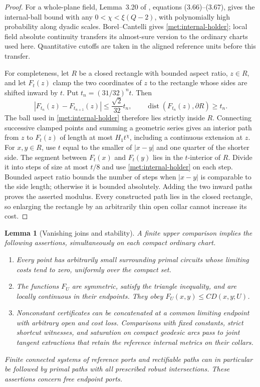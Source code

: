 \documentclass[11pt]{article}
\numberwithin{equation}{section}
\newtheorem{lemma}[theorem]{Lemma}
\theoremstyle{definition}
\theoremstyle{remark}
\newcommand{\1}{\mathbf 1}
\DeclareMathOperator{\dist}{dist}
\begin{document}
\begin{proof}
For a whole-plane field, Lemma~3.20 of \cite{DubedatEtAlWeakMetric}, equations
(3.66)--(3.67), gives the internal-ball bound with any
$0<\chi<\xi(Q-2)$, with polynomially high probability along dyadic
scales.  Borel--Cantelli gives \eqref{met:internal-holder}; local field
absolute continuity transfers its almost-sure version to the ordinary
charts used here.  Quantitative cutoffs are taken in the aligned
reference units before this transfer.

For completeness, let $R$ be a closed rectangle with bounded aspect
ratio, $z\in R$, and let $F_t(z)$ clamp the two coordinates of $z$ to
the rectangle whose sides are shifted inward by $t$.  Put
$t_n=(31/32)^nt$.  Then
\[
 |F_{t_n}(z)-F_{t_{n+1}}(z)|\leq \frac{\sqrt2}{32}t_n,
 \qquad \dist(F_{t_n}(z),\partial R)\geq t_n.
\]
The ball used in \eqref{met:internal-holder} therefore lies strictly
inside $R$.  Connecting successive clamped points and summing a
geometric series gives an interior path from $z$ to $F_t(z)$ of length
at most $H_1t^\chi$, including a continuous extension at $z$.  For
$x,y\in R$, use $t$ equal to the smaller of $|x-y|$ and one quarter of
the shorter side.  The segment between $F_t(x)$ and $F_t(y)$ lies in the
$t$-interior of $R$.  Divide it into steps of size at most $t/8$ and use
\eqref{met:internal-holder} on each step.  Bounded aspect ratio bounds
the number of steps when $|x-y|$ is comparable to the side length;
otherwise it is bounded absolutely.  Adding the two inward paths
proves the asserted modulus.  Every constructed path lies in the
closed rectangle, so enlarging the rectangle by an arbitrarily thin
open collar cannot increase its cost.
\end{proof}

\begin{lemma}[Vanishing joins and stability]
\label{met:vanishing-joins}
A finite upper comparison implies the following assertions,
simultaneously on each compact ordinary chart.
\begin{enumerate}
\item Every point has arbitrarily small surrounding primal circuits
whose limiting costs tend to zero, uniformly over the compact set.
\item The functions $F_U$ are symmetric, satisfy the triangle
inequality, and are locally continuous in their endpoints.  They obey
$F_U(x,y)\leq C D(x,y;U)$.
\item Nonconstant certificates can be concatenated at a common
limiting endpoint with arbitrary open and cost loss.  Comparisons with
fixed constants, strict shortcut witnesses, and saturation on compact
geodesic arcs pass to joint tangent extractions that retain the
reference internal metrics on their collars.
\end{enumerate}
Finite connected systems of reference ports and rectifiable paths can
in particular be followed by primal paths with all prescribed robust
intersections.  These assertions concern free endpoint ports.
\end{lemma}
\end{document}
